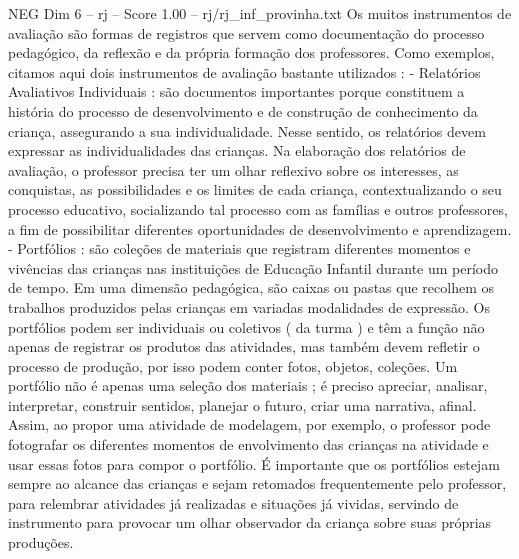 \begin{textsample}{NEG Dim 6 – rj – Score 1.00 – rj/rj\_inf\_provinha.txt}
Os muitos instrumentos de avaliação são formas de registros que servem como documentação do processo pedagógico, da reflexão e da própria formação dos professores.
Como exemplos, citamos aqui dois instrumentos de avaliação bastante utilizados : - Relatórios Avaliativos Individuais : são documentos importantes porque constituem a história do processo de desenvolvimento e de construção de conhecimento da criança, assegurando a sua individualidade.
Nesse sentido, os relatórios devem expressar as individualidades das crianças.
Na elaboração dos relatórios de avaliação, o professor precisa ter um olhar reflexivo sobre os interesses, as conquistas, as possibilidades e os limites de cada criança, contextualizando o seu processo educativo, socializando tal processo com as famílias e outros professores, a fim de possibilitar diferentes oportunidades de desenvolvimento e aprendizagem. - Portfólios : são coleções de materiais que registram diferentes momentos e vivências das crianças nas instituições de Educação Infantil durante um período de tempo.
Em uma dimensão pedagógica, são caixas ou pastas que recolhem os trabalhos produzidos pelas crianças em variadas modalidades de expressão.
Os portfólios podem ser individuais ou coletivos ( da turma ) e têm a função não apenas de registrar os produtos das atividades, mas também devem refletir o processo de produção, por isso podem conter fotos, objetos, coleções.
Um portfólio não é apenas uma seleção dos materiais ; é preciso apreciar, analisar, interpretar, construir sentidos, planejar o futuro, criar uma narrativa, afinal.
Assim, ao propor uma atividade de modelagem, por exemplo, o professor pode fotografar os diferentes momentos de envolvimento das crianças na atividade e usar essas fotos para compor o portfólio.
É importante que os portfólios estejam sempre ao alcance das crianças e sejam retomados frequentemente pelo professor, para relembrar atividades já realizadas e situações já vividas, servindo de instrumento para provocar um olhar observador da criança sobre suas próprias produções.

\end{textsample}
